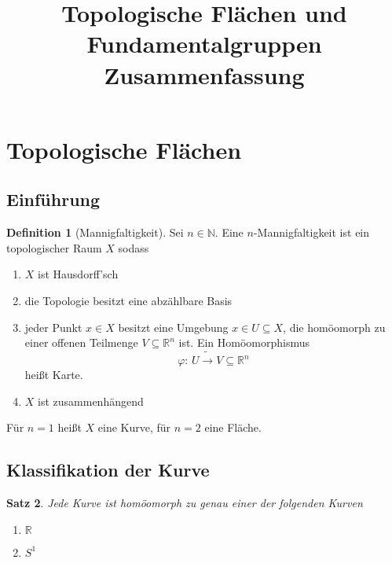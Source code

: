 \documentclass[a4paper, 12pt]{article}
\theoremstyle{plain}
\newtheorem{theorem}{Satz}[section] %
\theoremstyle{definition}
\newtheorem{definition}[theorem]{Definition} %
\theoremstyle{lemma}
\theoremstyle{remark}
\theoremstyle{corollary}
\theoremstyle{example}
\begin{document}
	\begin{titlepage} 
		\title{Topologische Flächen und Fundamentalgruppen Zusammenfassung}
		\clearpage\maketitle
		\thispagestyle{empty}
	\end{titlepage}
	\tableofcontents
	\newpage
	\section{Topologische Flächen}
	\subsection{Einführung}
	\begin{definition}[Mannigfaltigkeit]
		Sei $n \in \mathbb{N}$. Eine $n$-Mannigfaltigkeit ist ein topologischer Raum $X$ sodass \begin{enumerate}
			\item $X$ ist Hausdorff'sch
			\item die Topologie besitzt eine abzählbare Basis
			\item jeder Punkt $x \in X$ besitzt eine Umgebung $x\in U\subseteq X$, die homöomorph zu einer offenen Teilmenge $V\subseteq \mathbb{R}^n$ ist. Ein Homöomorphismus \[\varphi: \, U \tilde{\rightarrow} V \subseteq \mathbb{R}^n\] heißt Karte.
			\item $X$ ist zusammenhängend
		\end{enumerate}
	\end{definition}
	Für $n=1$ heißt $X$ eine Kurve, für $n=2$ eine Fläche.
	\subsection{Klassifikation der Kurve}
	\begin{theorem}
		Jede Kurve ist homöomorph zu genau einer der folgenden Kurven \begin{enumerate}
			\item $\mathbb{R}$
			\item $S^1$
		\end{enumerate}
	\end{theorem}
\end{document}
